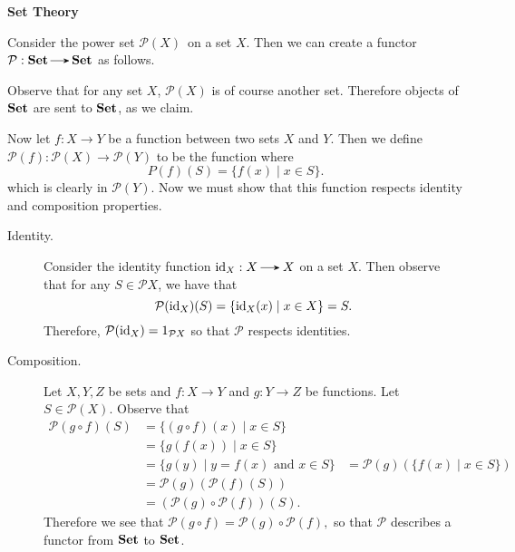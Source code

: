     {\large\noindent \textbf{Set Theory}\par}
    \begin{example}
        Consider the power set $\mathcal{P}(X)$ on a set $X$.
        Then we can create a functor $\mathcal{P}: \Set \to
        \Set$ as follows. 
        
        Observe that for any set $X$, $\mathcal{P}(X)$ is of course
        another set. Therefore objects of $\operatorname{\mathbf{Set}}$ are sent to
        $\operatorname{\mathbf{Set}}$, as we claim. 

        Now let $f: X \to Y$ be a function between two sets $X$ and
        $Y$. Then we define $\mathcal{P}(f) : \mathcal{P}(X) \to
        \mathcal{P}(Y)$ to be the function where 
        \[
            P(f)(S) = \{f(x) \mid x \in S\}.
        \]
        which is clearly in $\mathcal{P}(Y)$.
        Now we must show that this function
        respects identity and composition properties.
        \begin{description}
            \item[Identity.] Consider the identity function 
            $\id_X: X \to X$ on a set $X$. 
            Then observe that for any $S \in \mathcal{P}X$, we have that  
            \[
                \mathcal{P}(\operatorname{\mathrm{id}}_X)(S) 
                =
                \{\operatorname{\mathrm{id}}_X(x) \mid x \in X\} = S.
            \] 
            Therefore, $\mathcal{P}(\operatorname{\mathrm{id}}_X) = 1_{\mathcal{P}X}$ so
            that $\mathcal{P}$ respects identities. 

            \item[Composition.] Let $X, Y, Z$ be sets and $f: X \to Y$
            and $g: Y \to Z$ be functions. Let $S \in \mathcal{P}(X)$.
            Observe that 
            \begin{align*}
                \mathcal{P}(g \circ f)(S) 
                &= \{(g \circ f)(x) \mid x \in S \}\\
                &= \{ g(f(x)) \mid x \in S \}\\
                &= \{ g(y) \mid y = f(x) \text{ and } x \in S\}
                &= \mathcal{P}(g)(\{f(x) \mid x \in S\})\\
                &= \mathcal{P}(g)( \mathcal{P}(f)(S))\\
                &= (\mathcal{P}(g) \circ \mathcal{P}(f)) (S).
            \end{align*}
            Therefore we see that $\mathcal{P}(g \circ f) =
            \mathcal{P}(g) \circ \mathcal{P}(f),$ so that
            $\mathcal{P}$ describes a functor from $\operatorname{\mathbf{Set}}$ to $\operatorname{\mathbf{Set}}$.
        \end{description}
    \end{example}

